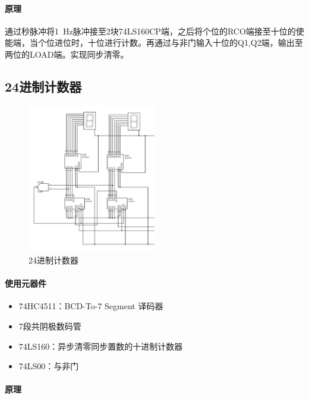 \documentclass[lang=cn, 11pt, a4paper, cite=authornum, ctexfont]{paper}
\begin{document}
\paragraph{原理}

通过秒脉冲将\SI{1}{\hertz}脉冲接至2块74LS160CP端，之后将个位的RCO端接至十位的使能端，当个位进位时，十位进行计数。再通过与非门输入十位的Q1,Q2端，输出至两位的LOAD端。实现同步清零。

\subsection{24进制计数器}

\begin{figure}[H]
	\begin{center}
		\includegraphics[width=0.5\textwidth]{pdf/计数器-24进制.PDF}
		\caption{24进制计数器\label{ifg:count24}}
	\end{center}
\end{figure}

\paragraph{使用元器件}

\begin{itemize}
	\item 74HC4511：BCD-To-7 Segment 译码器
	\item 7段共阴极数码管
	\item 74LS160：异步清零同步置数的十进制计数器
	\item 74LS00：与非门
\end{itemize}


\paragraph{原理}
\end{document}
